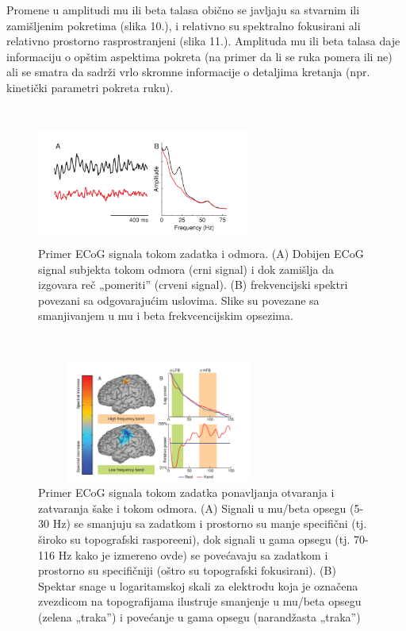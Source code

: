 \documentclass[conference]{IEEEtran}
\begin{document}
Promene u amplitudi mu ili  beta talasa obično se javljaju sa stvarnim ili zamišljenim pokretima (slika 10.), i relativno su spektralno fokusirani ali relativno prostorno rasprostranjeni (slika 11.). Amplituda mu ili beta talasa daje informaciju o opštim aspektima pokreta (na primer da li se ruka pomera ili ne) ali se smatra da sadrži vrlo skromne informacije o detaljima kretanja (npr. kinetički parametri pokreta ruku).\\
\\
\begin{figure}[htp]
\centerline{\includegraphics[width=7cm, height=4cm]{mu beta.png}}
\caption{Primer ECoG signala tokom zadatka i odmora. (A) Dobijen ECoG signal subjekta tokom odmora (crni signal) i dok zamišlja da izgovara reč „pomeriti” (crveni signal). (B) frekvencijski spektri povezani sa odgovarajućim uslovima. Slike su povezane sa smanjivanjem u mu i beta frekvcencijskim opsezima.}
\label{Slika}
\end{figure} \\
\begin{figure}[htp]
\centerline{\includegraphics[width=8cm, height=4cm]{frekv ecog.png}}
\caption{Primer ECoG signala tokom zadatka ponavljanja otvaranja i zatvaranja šake i tokom odmora. (A) Signali u mu/beta opsegu (5-30 Hz) se smanjuju sa zadatkom i prostorno su manje specifični (tj. široko su topografski raspore\dj eni), dok signali u gama opsegu (tj. 70-116 Hz kako je izmereno ovde) se povećavaju sa zadatkom i prostorno su specifičniji (oštro su topografski fokusirani). (B) Spektar snage u logaritamskoj skali za elektrodu koja je označena zvezdicom na topografijama ilustruje smanjenje u mu/beta opsegu (zelena „traka”) i povećanje u gama opsegu (narandžasta „traka”)}

\label{Slika}
\end{figure}
\end{document}
